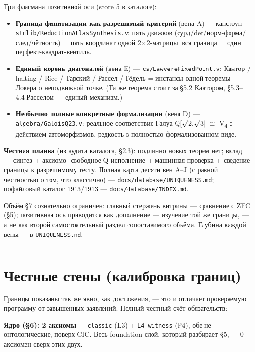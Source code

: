 \documentclass[11pt,a4paper]{article}
\begin{document}
Три флагмана позитивной оси (score 5 в каталоге):
\begin{itemize}
\item \textbf{Граница финитизации как разрешимый критерий} (вена A) --- капстоун \texttt{stdlib/\allowbreak{}Reduction\allowbreak{}Atlas\allowbreak{}Synthesis.v}: пять движков (сурд/det/норм-форма/след/чётность) = пять координат одной 2$\times$2-матрицы, вся граница = один перфект-квадрат-вентиль.
\item \textbf{Единый корень диагоналей} (вена E) --- \texttt{cs/\allowbreak{}Lawvere\allowbreak{}Fixed\allowbreak{}Point.v}: Кантор / halting / Rice / Тарский / Рассел / Гёдель = инстансы одной теоремы Ловера о неподвижной точке. (Та же теорема стоит за \S{}5.2 Кантором, \S{}5.3--4.4 Расселом --- единый механизм.)
\item \textbf{Необычно полные конкретные формализации} (вена D) --- \texttt{algebra/\allowbreak{}Galois\allowbreak{}Q23.v}: реальное соответствие Галуа Q[$\surd$2,$\surd$3] $\cong$ V\textsubscript{4} с действием автоморфизмов, редкость в полностью формализованном виде.
\end{itemize}

\textbf{Честная планка} (из аудита каталога, \S{}2.3): подлинно новых теорем нет; вклад --- синтез + аксиомо- свободное Q-исполнение + машинная проверка + сведение границы к разрешимому тесту. Полная карта десяти вен A--J (с равной честностью о том, что классично) --- \texttt{docs/\allowbreak{}database/\allowbreak{}UNIQUENESS.md}; пофайловый каталог 1913/1913 --- \texttt{docs/\allowbreak{}database/\allowbreak{}INDEX.md}.

Объём \S{}7 сознательно ограничен: главный стержень витрины --- сравнение с ZFC (\S{}5); позитивная ось приводится как дополнение --- изучение той же границы, --- а не как второй самостоятельный раздел сопоставимого объёма. Глубина каждой вены --- в \texttt{UNIQUENESS.md}.

\bigskip\hrule\bigskip

\section{Честные стены (калибровка границ)}

Границы показаны так же явно, как достижения, --- это и отличает проверяемую программу от завышенных заявлений. Полный честный счёт обязательств:

\textbf{Ядро (\S{}6): 2 аксиомы} --- \texttt{classic} (L3) + \texttt{L4\_\allowbreak{}witness} (P4), обе не-онтологические, поверх CIC. Весь foundation-слой, который разбирает \S{}5, --- 0-аксиомен сверх этих двух.
\end{document}
